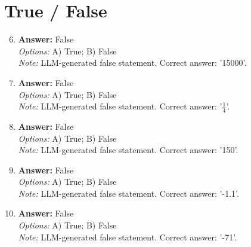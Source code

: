 \documentclass[12pt]{article}
\begin{document}
\section*{True / False}
\begin{enumerate}[label=\arabic*.]
\setcounter{enumi}{5}
\item \textbf{Answer:} False
\\ \textit{Options:} A) True; B) False
\\ \textit{Note:} LLM-generated false statement. Correct answer: '15000'.
\item \textbf{Answer:} False
\\ \textit{Options:} A) True; B) False
\\ \textit{Note:} LLM-generated false statement. Correct answer: '$\frac{1}{4}$'.
\item \textbf{Answer:} False
\\ \textit{Options:} A) True; B) False
\\ \textit{Note:} LLM-generated false statement. Correct answer: '150'.
\item \textbf{Answer:} False
\\ \textit{Options:} A) True; B) False
\\ \textit{Note:} LLM-generated false statement. Correct answer: '-1.1'.
\item \textbf{Answer:} False
\\ \textit{Options:} A) True; B) False
\\ \textit{Note:} LLM-generated false statement. Correct answer: '-71'.
\end{enumerate}
\end{document}
